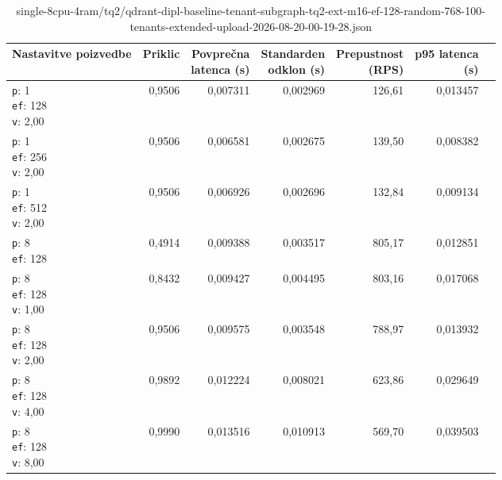 \begin{table}[htbp]
  \centering
\small
  \caption{single-8cpu-4ram/tq2/qdrant-dipl-baseline-tenant-subgraph-tq2-ext-m16-ef-128-random-768-100-tenants-extended-upload-2026-08-20-00-19-28.json}
  \label{tab:single-8cpu-4ram:tq2:qdrant-dipl-baseline-tenant-subgraph-tq2-ext-m16-ef-128-random-768-100-tenants-extended-upload-2026-08-20-00-19-28.json}
  \begin{tabularx}{\textwidth}{Xrrrrrr}
    \toprule
    Nastavitve poizvedbe & Priklic & \makecell{Povprečna\\latenca (s)} & \makecell{Standarden\\odklon (s)} & \makecell{Prepustnost\\(RPS)} & \makecell{p95 latenca\\(s)}  \\
    \midrule
    \makecell{\texttt{p}: 1\\\texttt{ef}: 128\\\texttt{v}: 2,00} & 0,9506 & 0,007311 & 0,002969 & 126,61 & 0,013457 \\
    \makecell{\texttt{p}: 1\\\texttt{ef}: 256\\\texttt{v}: 2,00} & 0,9506 & 0,006581 & 0,002675 & 139,50 & 0,008382 \\
    \makecell{\texttt{p}: 1\\\texttt{ef}: 512\\\texttt{v}: 2,00} & 0,9506 & 0,006926 & 0,002696 & 132,84 & 0,009134 \\
    \makecell{\texttt{p}: 8\\\texttt{ef}: 128} & 0,4914 & 0,009388 & 0,003517 & 805,17 & 0,012851 \\
    \makecell{\texttt{p}: 8\\\texttt{ef}: 128\\\texttt{v}: 1,00} & 0,8432 & 0,009427 & 0,004495 & 803,16 & 0,017068 \\
    \makecell{\texttt{p}: 8\\\texttt{ef}: 128\\\texttt{v}: 2,00} & 0,9506 & 0,009575 & 0,003548 & 788,97 & 0,013932 \\
    \makecell{\texttt{p}: 8\\\texttt{ef}: 128\\\texttt{v}: 4,00} & 0,9892 & 0,012224 & 0,008021 & 623,86 & 0,029649 \\
    \makecell{\texttt{p}: 8\\\texttt{ef}: 128\\\texttt{v}: 8,00} & 0,9990 & 0,013516 & 0,010913 & 569,70 & 0,039503 \\

\end{tabularx}
\end{table}
